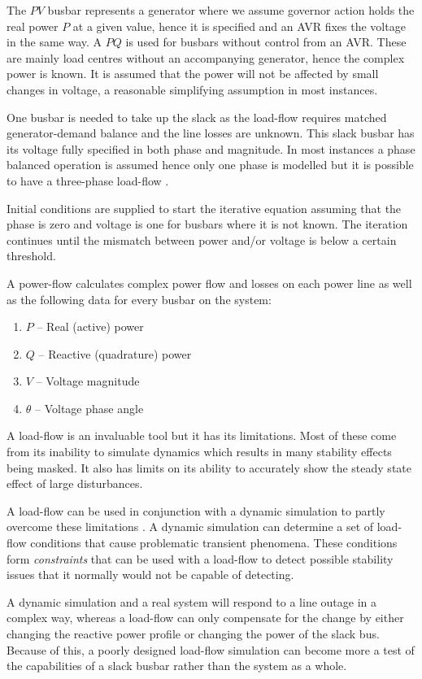 \documentclass[a4paper,oneside,12pt]{report}
\begin{document}
The $PV$ busbar represents a generator where we assume governor action holds the real power $P$ at a given value, hence it is specified and an AVR fixes the voltage in the same way. A $PQ$ is used for busbars without control from an AVR. These are mainly load centres without an accompanying generator, hence the complex power is known. It is assumed that the power will not be affected by small changes in voltage, a reasonable simplifying assumption in most instances.

One busbar is needed to take up the slack as the load-flow requires matched generator-demand balance and the line losses are unknown. This slack busbar has its voltage fully specified in both phase and magnitude. In most instances a phase balanced operation is assumed hence only one phase is modelled but it is possible to have a three-phase load-flow \cite{Arrillaga2001}.

Initial conditions are supplied to start the iterative equation assuming that the phase is zero and voltage is one for busbars where it is not known. The iteration continues until the mismatch between power and/or voltage is below a certain threshold.

A power-flow calculates complex power flow and losses on each power line as well as the following data for every busbar on the system:

\begin{enumerate}
\item $P$ -- Real (active) power
\item $Q$ -- Reactive (quadrature) power
\item $V$ -- Voltage magnitude
\item $\theta$ -- Voltage phase angle
\end{enumerate}

A load-flow is an invaluable tool but it has its limitations. Most of these come from its inability to simulate dynamics which results in  many stability effects being masked. It also has limits on its ability to accurately show the steady state effect of large disturbances.

A load-flow can be used in conjunction with a dynamic simulation to partly overcome these limitations . A dynamic simulation can determine a set of load-flow conditions that cause problematic transient phenomena. These conditions form \emph{constraints} that can be used with a load-flow to detect possible stability issues that it normally would not be capable of detecting.

A dynamic simulation and a real system will respond to a line outage in a complex way, whereas a load-flow can only compensate for the change by either changing the reactive power profile or changing the power of the slack bus. Because of this, a poorly designed load-flow simulation can become more a test of the capabilities of a slack busbar rather than the system as a whole.
\end{document}
